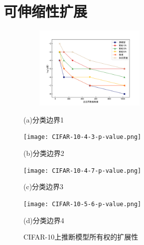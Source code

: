 \section{可伸缩性扩展}\label{5.6}

\begin{figure}[htbp]%
	\centering
	\begin{minipage}[htbp]{0.49\linewidth}        %
		\hspace{2mm}
		\centering
		\includegraphics[width=7cm,height=4cm]{CIFAR-10-4-2-p-value.png}
		\centerline{(a)分类边界1}
	\end{minipage}
	\begin{minipage}[htbp]{0.49\linewidth}        %
		\hspace{2mm}
		\centering
		\texttt{[image: CIFAR-10-4-3-p-value.png]}
		\centerline{(b)分类边界2}
	\end{minipage}
	\begin{minipage}[htbp]{0.49\linewidth}        %
		\hspace{2mm}
		\centering
		\texttt{[image: CIFAR-10-4-7-p-value.png]}
		\centerline{(c)分类边界3}
	\end{minipage}
	\begin{minipage}[htbp]{0.49\linewidth}        %
		\hspace{2mm}
		\centering
		\texttt{[image: CIFAR-10-5-6-p-value.png]}
		\centerline{(d)分类边界4}
	\end{minipage}
\setlength{\abovecaptionskip}{7mm} %
\caption{CIFAR-10上推断模型所有权的扩展性}
\label{CIFAR-10上推断模型所有权的扩展性}
\end {figure}
	
